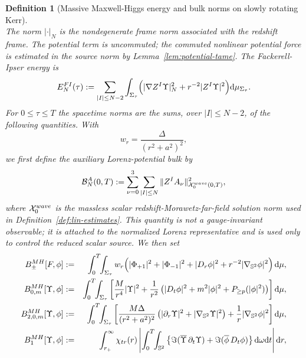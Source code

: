 \documentclass[10pt,a4paper]{amsart}
\newtheorem{definition}{Definition}
\newcommand{\dd}{\mathrm{d}}
\begin{document}
\begin{definition}[Massive Maxwell-Higgs energy and bulk norms on slowly rotating Kerr]
\begin{equation}
\end{equation}
The norm \(|\cdot|_N\) is the nondegenerate frame norm associated with the redshift frame.  The potential term is uncommuted; the commuted nonlinear potential force is estimated in the source norm by Lemma~\ref{lem:potential-tame}.  The Fackerell-Ipser energy is
\begin{equation}\label{eq:slow-FI-energy-def}
 E_N^{FI}(\tau):=
 \sum_{|I|\le N-2}\int_{\Sigma_\tau}
 \Bigl(|\nabla Z^I\Upsilon|_N^2+r^{-2}|Z^I\Upsilon|^2\Bigr)
 \dd\mu_{\Sigma_\tau}.
\end{equation}
For \(0\le \tau\le T\) the spacetime norms are the sums, over \(|I|\le N-2\), of the following quantities.  With
\begin{equation}
 w_r=\frac{\Delta}{(r^2+a^2)^2},
\end{equation}
we first define the auxiliary Lorenz-potential bulk by
\begin{equation}\label{eq:slow-A-bulk-def}
 \mathcal B_N^A(0,T)
 :=
 \sum_{\nu=0}^{3}\sum_{|I|\le N}
 \|Z^I A_\nu\|_{\mathcal X^{\rm wave}_{0}(0,T)}^2,
\end{equation}
where \(\mathcal X^{\rm wave}_{0}\) is the massless scalar redshift-Morawetz-far-field solution norm used in Definition~\ref{def:lin-estimates}.  This quantity is not a gauge-invariant observable; it is attached to the normalized Lorenz representative and is used only to control the reduced scalar source.  We then set
\begin{eqnarray}
B_{\pm}^{MH}[F,\phi]
&:=&
\int_{0}^{T}\!\!\int_{\Sigma_\tau}
 w_r\Bigl(|\Phi_{+1}|^2+|\Phi_{-1}|^2+|D_r\phi|^2
 +r^{-2}|\nabla_{\mathbb S^2}\phi|^2\Bigr)\,\dd\mu,
\label{eq:slow-Bpm-def}\\
B_{0,m}^{MH}[\Upsilon,\phi]
&:=&
\int_{0}^{T}\!\!\int_{\Sigma_\tau}
\left[
 \frac{M}{r^4}|\Upsilon|^2
 +\frac1{r^2}\left(|D_t\phi|^2+m^2|\phi|^2+P_{\ge p}(|\phi|^2)\right)
\right]\dd\mu,
\label{eq:slow-B0-def}\\
B_{2,0,m}^{MH}[\Upsilon,\phi]
&:=&
\int_{0}^{T}\!\!\int_{\Sigma_\tau}
\left[
 \frac{M\Delta}{(r^2+a^2)^2}\left(|\partial_r\Upsilon|^2
 +|\nabla_{\mathbb S^2}\Upsilon|^2\right)
 +\frac1r|\nabla_{\mathbb S^2}\phi|^2
\right]\dd\mu,
\label{eq:slow-B20-def}\\
B_1^{MH}[\Upsilon,\phi]
&:=&
\int_{r_+}^{\infty}\chi_{tr}(r)
\left|\int_0^T\!\!\int_{\mathbb S^2}
\left\{
 \Im(\overline\Upsilon\,\partial_t\Upsilon)
 +\Im(\overline\phi\,D_t\phi)
\right\}\dd\omega\dd t\right|\dd r,
\label{eq:slow-B1-def}
\end{eqnarray}

\end{definition}
\end{document}
